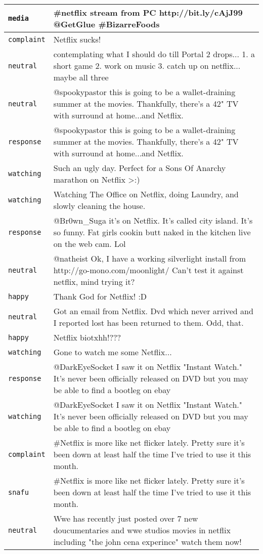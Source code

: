 {\begin{longtable}{|l|p{160mm}|}
         \texttt{media} & \#netflix stream from PC http://bit.ly/cAjJ99 @GetGlue \#BizarreFoods
      \tabularnewline\hline
         \texttt{complaint} & Netflix sucks!
      \tabularnewline\hline
         \texttt{neutral} & contemplating what I should do till Portal 2 drops... 1. a short game 2. work on music 3. catch up on netflix... maybe all three
      \tabularnewline\hline
         \texttt{neutral} & @spookypastor this is going to be a wallet-draining summer at the movies. Thankfully, there's a 42" TV with surround at home...and Netflix.
      \tabularnewline\hline
         \texttt{response} & @spookypastor this is going to be a wallet-draining summer at the movies. Thankfully, there's a 42" TV with surround at home...and Netflix.
      \tabularnewline\hline
         \texttt{watching} & Such an ugly day. Perfect for a Sons Of Anarchy marathon on Netflix >:)
      \tabularnewline\hline
         \texttt{watching} & Watching The Office on Netflix, doing Laundry, and slowly cleaning the house.
      \tabularnewline\hline
         \texttt{response} & @Br0wn\_Suga it's on Netflix. It's called city island. It's so funny. Fat girls cookin butt naked in the kitchen live on the web cam. Lol
      \tabularnewline\hline
         \texttt{neutral} & @natheist Ok, I have a working silverlight install from http://go-mono.com/moonlight/ Can't test it against netflix, mind trying it?
      \tabularnewline\hline
         \texttt{happy} & Thank God for Netflix! :D
      \tabularnewline\hline
         \texttt{neutral} & Got an email from Netflix. Dvd which never arrived and I reported lost has been returned to them. Odd, that.
      \tabularnewline\hline
         \texttt{happy} & Netflix biotxhh!???
      \tabularnewline\hline
         \texttt{watching} & Gone to watch me some Netflix...
      \tabularnewline\hline
         \texttt{response} & @DarkEyeSocket I saw it on Netflix "Instant Watch." It's never been officially released on DVD but you may be able to find a bootleg on ebay
      \tabularnewline\hline
         \texttt{watching} & @DarkEyeSocket I saw it on Netflix "Instant Watch." It's never been officially released on DVD but you may be able to find a bootleg on ebay
      \tabularnewline\hline
         \texttt{complaint} & \#Netflix is more like net flicker lately. Pretty sure it's been down at least half the time I've tried to use it this month.
      \tabularnewline\hline
         \texttt{snafu} & \#Netflix is more like net flicker lately. Pretty sure it's been down at least half the time I've tried to use it this month.
      \tabularnewline\hline
         \texttt{neutral} & Wwe has recently just posted over 7 new doucumentaries and wwe studios movies in netflix including "the john cena experince" watch them now!

\end{longtable}}
